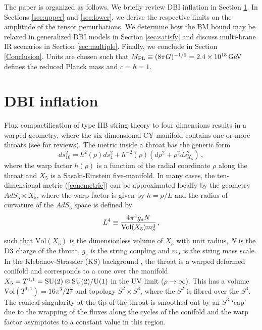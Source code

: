 The paper is organized as follows. We briefly review DBI inflation 
in Section \ref{sec:dbiinflation}. In Sections \ref{sec:upper} and  
\ref{sec:lower}, we derive the respective 
limits on the amplitude of the tensor perturbations.  
We determine how the BM bound may be relaxed in generalized DBI models in 
Section \ref{sec:satisfy} and discuss multi-brane 
IR scenarios in Section \ref{sec:multiple}. Finally, we conclude  
in Section \ref{Conclusion}.   
Units are chosen such that $M_{\mathrm{PL}} \equiv (8\pi G )^{-1/2}= 2 
.4 \times 10^{18}\, {\rm GeV}$ 
defines the reduced Planck mass and $c=\hbar =1$. 
% 
% 
% 
% 
\section{DBI inflation} 
% 
\label{sec:dbiinflation}

Flux compactification of type IIB string theory to four dimensions 
results in a warped geometry, where the six-dimensional CY  
manifold contains one or more throats (see \cite{grana,douglas} for reviews). 
The metric inside a throat has the generic form
\begin{equation}
\label{conemetric}
ds_{10}^2= h^2 ( \rho) ds_4^2 + h^{-2} (\rho ) 
\left( d\rho^2 +\rho^2 ds_{X_5}^2 \right) \,,
\end{equation} 
where the warp factor $h (\rho)$ is a function of the 
radial coordinate $\rho$ along the throat and $X_5$
is a Sasaki-Einstein five-manifold. 
In many cases, the ten-dimensional metric (\ref{conemetric}) can be 
approximated locally by the geometry $AdS_5 \times X_5$, where the 
warp factor is given by $h=\rho /L$ and 
the radius of curvature of the $AdS_5$ space is defined by 
\begin{equation}
L^4 \equiv \frac{4\pi^4 g_s N}{{\rm Vol} (X_5) m_s^4} \,,
\end{equation}
such that $\mathrm{Vol}(X_5)$ is the dimensionless volume of 
$X_5$ with unit radius, $N$ is the ${\rm D3}$  charge of the throat, 
$g_s$ is the string coupling and $m_s$ is the string mass scale.
In the Klebanov-Strassler (KS) background \cite{ks}, the throat 
is a warped deformed conifold and 
corresponds to a cone over the manifold 
$X_5 = T^{1,1}= {\rm SU(2)} \otimes {\rm SU(2)}/{\rm U(1)}$
in the UV limit ($\rho \rightarrow \infty$). This has   
a volume $\mathrm{Vol} (T^{1,1}) = 16\pi^3/27$ and  topology
$S^2\times S^3$, where the $S^2$ is fibred over the $S^3$.
The conical singularity at the tip of the throat 
is smoothed out by an 
$S^3$ `cap' due to the wrapping of the fluxes along the cycles of the conifold
\cite{ks,kt} and the warp factor asymptotes to 
a constant value in this region.   
 

